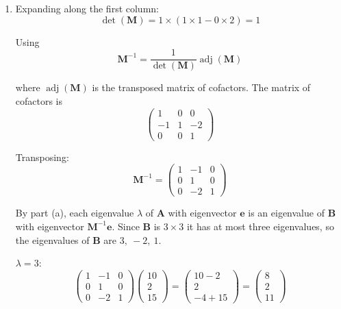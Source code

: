 \documentclass[leqno]{article}
\begin{document}
\begin{enumerate}[
  label=\textbf{\arabic*.},
  leftmargin=*,
  topsep=0pt,
  partopsep=0pt,
  parsep=0pt
]
\begin{djsSolution}
\begin{enumerate}[label=\textbf{(\alph*)}, start=1]
\(\lambda=1\):
\[
\begin{pmatrix}2&0&0\\1&-3&0\\2&5&0\end{pmatrix}\begin{pmatrix}x\\y\\z\end{pmatrix}=\mathbf{0}\quad\Longrightarrow\quad x=0,\qquad y=0
\]

with \(z\) free. An eigenvector is \(\begin{pmatrix}0\\0\\1\end{pmatrix}\).

Any non-zero multiples of these vectors are also eigenvectors.

  \item Expanding along the first column:
\[
\det(\mathbf{M})=1\times(1\times1-0\times2)=1
\]

Using
\[
\mathbf{M}^{-1}=\frac{1}{\det(\mathbf{M})}\operatorname{adj}(\mathbf{M})
\]

where \(\operatorname{adj}(\mathbf{M})\) is the transposed matrix of cofactors. The matrix of cofactors is
\[
\begin{pmatrix}1&0&0\\-1&1&-2\\0&0&1\end{pmatrix}
\]

Transposing:
\[
\mathbf{M}^{-1}=\begin{pmatrix}1&-1&0\\0&1&0\\0&-2&1\end{pmatrix}
\]

By part (a), each eigenvalue \(\lambda\) of \(\mathbf{A}\) with eigenvector \(\mathbf{e}\) is an eigenvalue of \(\mathbf{B}\) with eigenvector \(\mathbf{M}^{-1}\mathbf{e}\). Since \(\mathbf{B}\) is \(3\times3\) it has at most three eigenvalues, so the eigenvalues of \(\mathbf{B}\) are \(3,\ -2,\ 1\).

\(\lambda=3\):
\[
\begin{pmatrix}1&-1&0\\0&1&0\\0&-2&1\end{pmatrix}\begin{pmatrix}10\\2\\15\end{pmatrix}=\begin{pmatrix}10-2\\2\\-4+15\end{pmatrix}=\begin{pmatrix}8\\2\\11\end{pmatrix}
\]


\end{enumerate}
\end{djsSolution}
\end{enumerate}
\end{document}
